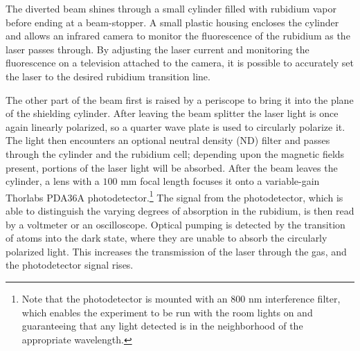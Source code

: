 The diverted beam shines through a small cylinder filled with rubidium vapor before ending at a beam-stopper. A small plastic housing encloses the cylinder and allows an infrared camera to monitor the fluorescence of the rubidium as the laser passes through. By adjusting the laser current and monitoring the fluorescence on a television attached to the camera, it is possible to accurately set the laser to the desired rubidium transition line.

The other part of the beam first is raised by a periscope to bring it into the plane of the shielding cylinder. After leaving the beam splitter the laser light is once again linearly polarized, so a quarter wave plate is used to circularly polarize it. The light then encounters an optional neutral density (ND) filter and passes through the cylinder and the rubidium cell; depending upon the magnetic fields present, portions of the laser light will be absorbed. After the beam leaves the cylinder, a lens with a $100$ mm focal length focuses it onto a variable-gain Thorlabs PDA36A photodetector.\footnote{Note that the photodetector is mounted with an $800$ nm interference filter, which enables the experiment to be run with the room lights on and guaranteeing that any light detected is in the neighborhood of the appropriate wavelength.} The signal from the photodetector, which is able to distinguish the varying degrees of absorption in the rubidium, is then read by a voltmeter or an oscilloscope. Optical pumping is detected by the transition of atoms into the dark state, where they are unable to absorb the circularly polarized light. This increases the transmission of the laser through the gas, and the photodetector signal rises.


